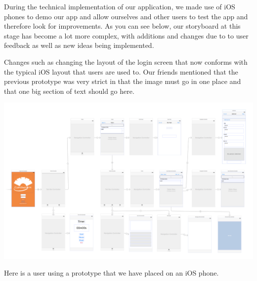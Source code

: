 \documentclass{article}
\begin{document}
\newpage

During the technical implementation of our application, we made use of iOS phones to demo our app and allow ourselves and other users to test the app and therefore look for improvements.  As you can see below, our storyboard at this stage has become a lot more complex, with additions and changes due to to user feedback as well as new ideas being implemented.

Changes such as changing the layout of the login screen that now conforms with the typical iOS layout that users are used to.  Our friends mentioned that the previous prototype was very strict in that the image must go in one place and that one big section of text should go here.

\begin{center}
	\vspace{1mm}
	\includegraphics[scale=0.3]{storyboard.png}
	\vspace{1mm}
\end{center}

Here is a user using a prototype that we have placed on an iOS phone.	
\end{document}
